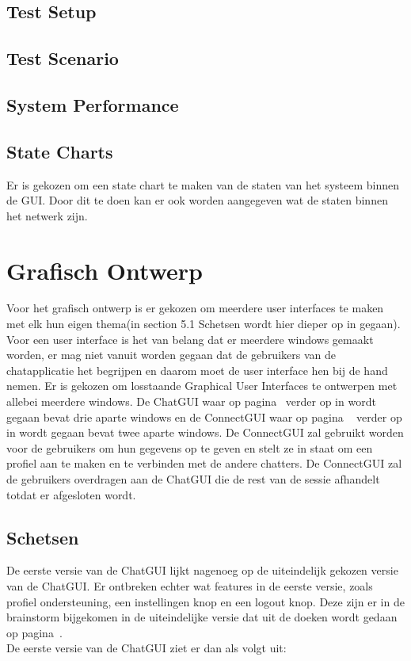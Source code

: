 \documentclass[12pt]{article}
\begin{document}
\subsection{Test Setup}


\subsection{Test Scenario}


\subsection{System Performance}


\subsection{State Charts}
Er is gekozen om een state chart te maken van de staten van het systeem binnen de GUI. Door dit te doen kan er ook worden aangegeven wat de staten binnen het netwerk zijn.

\newpage

\section{Grafisch Ontwerp}
\label{aangegeven}
Voor het grafisch ontwerp is er gekozen om meerdere user interfaces te maken met elk hun eigen thema(in section 5.1 Schetsen wordt hier dieper op in gegaan). Voor een user interface is het van belang dat er meerdere windows gemaakt worden, er mag niet vanuit worden gegaan dat de gebruikers van de chatapplicatie het begrijpen en daarom moet de user interface hen bij de hand nemen.  Er is gekozen om losstaande Graphical User Interfaces te ontwerpen met allebei meerdere windows. De ChatGUI waar op pagina~\pageref{ChatGUI} verder op in wordt gegaan bevat drie aparte windows en de ConnectGUI waar op pagina ~\pageref{ConnectGUI} verder op in wordt gegaan bevat twee aparte windows. De ConnectGUI zal gebruikt worden voor de gebruikers om hun gegevens op te geven en stelt ze in staat om een profiel aan te maken en te verbinden met de andere chatters. De ConnectGUI zal de gebruikers overdragen aan de ChatGUI die de rest van de sessie afhandelt totdat er afgesloten wordt.

\subsection{Schetsen}
De eerste versie van de ChatGUI lijkt nagenoeg op de uiteindelijk gekozen versie van de ChatGUI. Er ontbreken echter wat features in de eerste versie, zoals profiel ondersteuning, een instellingen knop en een  logout knop. Deze zijn er in de brainstorm bijgekomen in de uiteindelijke versie dat uit de doeken wordt gedaan op pagina~\pageref{Chat Window}. \\
De eerste versie van de ChatGUI ziet er dan als volgt uit:
\\
\end{document}
